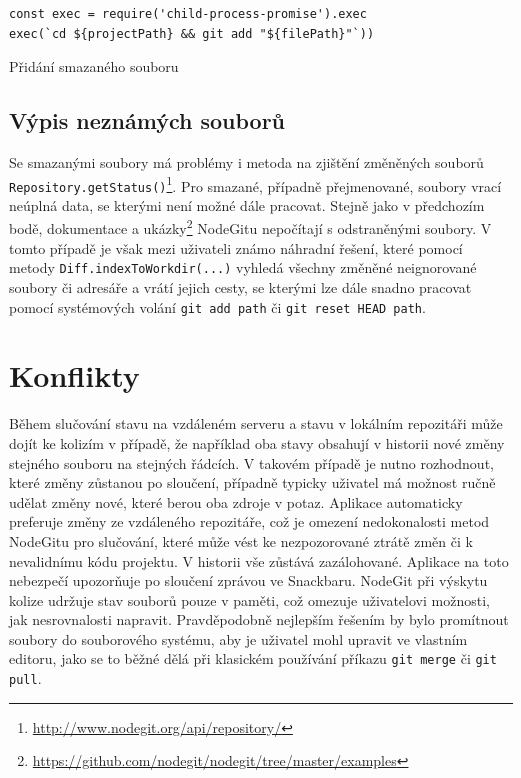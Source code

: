 \FloatBarrier
\begin{listing}[ht]
	\begin{verbatim}
const exec = require('child-process-promise').exec
exec(`cd ${projectPath} && git add "${filePath}"`))
	\end{verbatim}
	\caption{Přidání smazaného souboru}
\end{listing}
\FloatBarrier

\subsection{Výpis neznámých souborů}

Se smazanými soubory má problémy i metoda na zjištění změněných souborů \texttt{Repository.getStatus()}\footnote{\url{http://www.nodegit.org/api/repository/}}. Pro smazané, případně přejmenované, soubory vrací neúplná data, se kterými není možné dále pracovat. Stejně jako v předchozím bodě, dokumentace a ukázky\footnote{\url{https://github.com/nodegit/nodegit/tree/master/examples}} NodeGitu nepočítají s odstraněnými soubory. V tomto případě je však mezi uživateli známo náhradní řešení, které pomocí metody \texttt{Diff.indexToWorkdir(...)} vyhledá všechny změněné neignorované soubory či adresáře a vrátí jejich cesty, se kterými lze dále snadno pracovat pomocí systémových volání \texttt{git add path} či \texttt{git reset HEAD path}.

\section{Konflikty}

Během slučování stavu na vzdáleném serveru a stavu v lokálním repozitáři může dojít ke kolizím v případě, že například oba stavy obsahují v historii nové změny stejného souboru na stejných řádcích. V takovém případě je nutno rozhodnout, které změny zůstanou po sloučení, případně typicky uživatel má možnost ručně udělat změny nové, které berou oba zdroje v potaz. Aplikace automaticky preferuje změny ze vzdáleného repozitáře, což je omezení nedokonalosti metod NodeGitu pro slučování, které může vést ke nezpozorované ztrátě změn či k nevalidnímu kódu projektu. V historii vše zůstává zazálohované. Aplikace na toto nebezpečí upozorňuje po sloučení zprávou ve Snackbaru. NodeGit při výskytu kolize udržuje stav souborů pouze v paměti, což omezuje uživatelovi možnosti, jak nesrovnalosti napravit. Pravděpodobně nejlepším řešením by bylo promítnout soubory do souborového systému, aby je uživatel mohl upravit ve vlastním editoru, jako se to běžné dělá při klasickém používání příkazu \texttt{git merge} či \texttt{git pull}.

